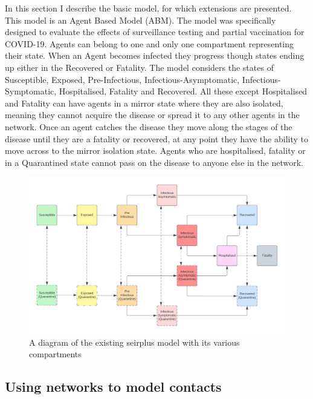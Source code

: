 \documentclass{article}
\begin{document}
In this section I describe the basic model, for which extensions are presented. 
This model is an Agent Based Model (ABM). 
The model was specifically designed to evaluate the effects of surveillance testing and partial vaccination for COVID-19.
Agents can belong to one and only one compartment representing their state. 
When an Agent becomes infected they progress though states ending up either in the Recovered or Fatality. 
The model considers the states of Susceptible, Exposed, Pre-Infectious, Infectious-Asymptomatic, Infectious-Symptomatic, Hospitalised, Fatality and Recovered. All these except Hospitalised and Fatality can have agents in a mirror state where they are also isolated, meaning they cannot acquire the disease or spread it to any other agents in the network. Once an agent catches the disease they move along the stages of the disease until they are a fatality or recovered, at any point they have the ability to move across to the mirror isolation state. Agents who are hospitalised, fatality or in a Quarantined state cannot pass on the disease to anyone else in the network.



\begin{figure}[h!]
\centering
\includegraphics[width=1.3\textwidth]{SIR}
\caption{A diagram of the existing seirplus model with its various compartments ~\cite{mcgee_2021}}
\end{figure}

\newpage



\subsection{Using networks to model contacts}
\end{document}
